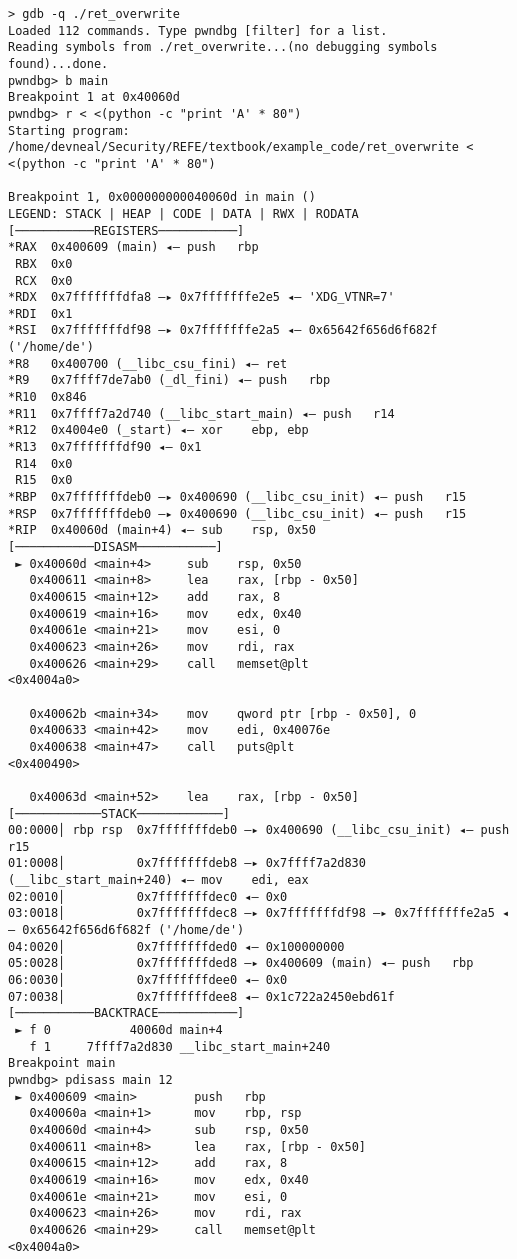 \begin{lstlisting}
> gdb -q ./ret_overwrite 
Loaded 112 commands. Type pwndbg [filter] for a list.
Reading symbols from ./ret_overwrite...(no debugging symbols found)...done.
pwndbg> b main
Breakpoint 1 at 0x40060d
pwndbg> r < <(python -c "print 'A' * 80")
Starting program: /home/devneal/Security/REFE/textbook/example_code/ret_overwrite < <(python -c "print 'A' * 80")

Breakpoint 1, 0x000000000040060d in main ()
LEGEND: STACK | HEAP | CODE | DATA | RWX | RODATA
[───────────REGISTERS───────────]
*RAX  0x400609 (main) ◂— push   rbp
 RBX  0x0
 RCX  0x0
*RDX  0x7fffffffdfa8 —▸ 0x7fffffffe2e5 ◂— 'XDG_VTNR=7'
*RDI  0x1
*RSI  0x7fffffffdf98 —▸ 0x7fffffffe2a5 ◂— 0x65642f656d6f682f ('/home/de')
*R8   0x400700 (__libc_csu_fini) ◂— ret    
*R9   0x7ffff7de7ab0 (_dl_fini) ◂— push   rbp
*R10  0x846
*R11  0x7ffff7a2d740 (__libc_start_main) ◂— push   r14
*R12  0x4004e0 (_start) ◂— xor    ebp, ebp
*R13  0x7fffffffdf90 ◂— 0x1
 R14  0x0
 R15  0x0
*RBP  0x7fffffffdeb0 —▸ 0x400690 (__libc_csu_init) ◂— push   r15
*RSP  0x7fffffffdeb0 —▸ 0x400690 (__libc_csu_init) ◂— push   r15
*RIP  0x40060d (main+4) ◂— sub    rsp, 0x50
[───────────DISASM───────────]
 ► 0x40060d <main+4>     sub    rsp, 0x50
   0x400611 <main+8>     lea    rax, [rbp - 0x50]
   0x400615 <main+12>    add    rax, 8
   0x400619 <main+16>    mov    edx, 0x40
   0x40061e <main+21>    mov    esi, 0
   0x400623 <main+26>    mov    rdi, rax
   0x400626 <main+29>    call   memset@plt                    <0x4004a0>
 
   0x40062b <main+34>    mov    qword ptr [rbp - 0x50], 0
   0x400633 <main+42>    mov    edi, 0x40076e
   0x400638 <main+47>    call   puts@plt                      <0x400490>
 
   0x40063d <main+52>    lea    rax, [rbp - 0x50]
[────────────STACK────────────]
00:0000│ rbp rsp  0x7fffffffdeb0 —▸ 0x400690 (__libc_csu_init) ◂— push   r15
01:0008│          0x7fffffffdeb8 —▸ 0x7ffff7a2d830 (__libc_start_main+240) ◂— mov    edi, eax
02:0010│          0x7fffffffdec0 ◂— 0x0
03:0018│          0x7fffffffdec8 —▸ 0x7fffffffdf98 —▸ 0x7fffffffe2a5 ◂— 0x65642f656d6f682f ('/home/de')
04:0020│          0x7fffffffded0 ◂— 0x100000000
05:0028│          0x7fffffffded8 —▸ 0x400609 (main) ◂— push   rbp
06:0030│          0x7fffffffdee0 ◂— 0x0
07:0038│          0x7fffffffdee8 ◂— 0x1c722a2450ebd61f
[───────────BACKTRACE───────────]
 ► f 0           40060d main+4
   f 1     7ffff7a2d830 __libc_start_main+240
Breakpoint main
pwndbg> pdisass main 12
 ► 0x400609 <main>        push   rbp
   0x40060a <main+1>      mov    rbp, rsp
   0x40060d <main+4>      sub    rsp, 0x50
   0x400611 <main+8>      lea    rax, [rbp - 0x50]
   0x400615 <main+12>     add    rax, 8
   0x400619 <main+16>     mov    edx, 0x40
   0x40061e <main+21>     mov    esi, 0
   0x400623 <main+26>     mov    rdi, rax
   0x400626 <main+29>     call   memset@plt                    <0x4004a0>
 

\end{lstlisting}

